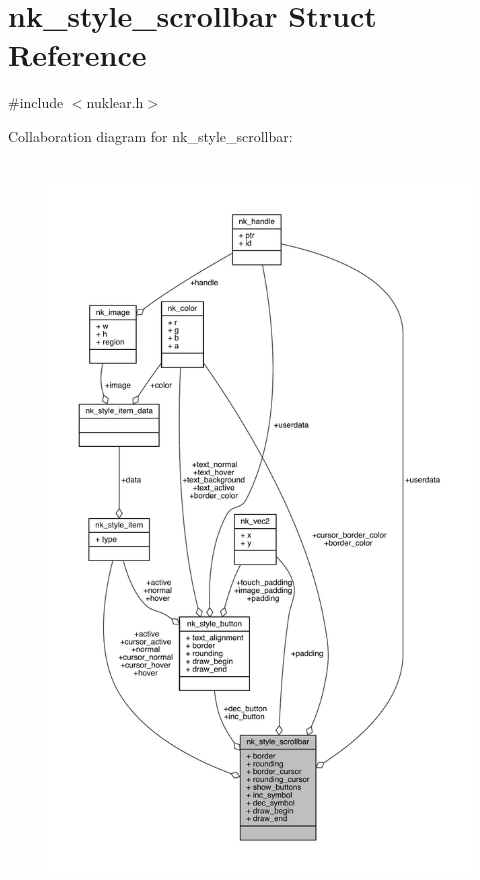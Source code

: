 \hypertarget{structnk__style__scrollbar}{}\section{nk\+\_\+style\+\_\+scrollbar Struct Reference}
\label{structnk__style__scrollbar}


{\ttfamily \#include $<$nuklear.\+h$>$}



Collaboration diagram for nk\+\_\+style\+\_\+scrollbar\+:
\nopagebreak
\begin{figure}[H]
\begin{center}
\leavevmode
\includegraphics[height=550pt]{structnk__style__scrollbar__coll__graph}
\end{center}
\end{figure}
